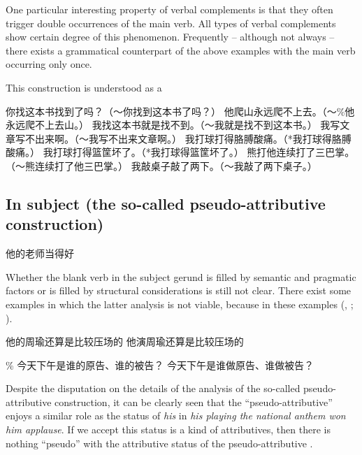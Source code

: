 \documentclass[UTF8, a4paper, oneside, scheme=plain, 12pt]{ctexrep}
\newcommand*{\citepage}[1]{p.~{#1}}
\newcommand{\form}[1]{\emph{#1}}
\begin{document}
One particular interesting property of verbal complements is 
that they often trigger double occurrences of the main verb. 
All types of verbal complements show certain degree of this phenomenon.
Frequently -- although not always -- 
there exists a grammatical counterpart of the above examples with the main verb occurring only once.

This construction is understood as a 

\begin{exe}
    \ex 你找这本书找到了吗？（～你找到这本书了吗？）
    \ex 他爬山永远爬不上去。（～\%他永远爬不上去山。）
    \ex 我找这本书就是找不到。（～我就是找不到这本书。）
    \ex 我写文章写不出来啊。（～我写不出来文章啊。）
    \ex 我打球打得胳膊酸痛。（*我打球得胳膊酸痛。）
    \ex 我打球打得篮筐坏了。（*我打球得篮筐坏了。）
    \ex 熊打他连续打了三巴掌。（～熊连续打了他三巴掌。）
    \ex 我敲桌子敲了两下。（～我敲了两下桌子。）
\end{exe}

\subsection{In subject (the so-called pseudo-attributive construction)}

\begin{exe}
    \ex 他的老师当得好
\end{exe}

Whether the blank verb in the subject gerund is filled by semantic and pragmatic factors 
or is filled by structural considerations 
is still not clear.
There exist some examples in which the latter analysis is not viable, 
because in these examples 
(,
; 
\citealt[\citepage{239}]{deng2010formal}).

\begin{exe}
    \ex\label{ex:verb-phrase.vp-argument.subject-semantic.1} 
    \begin{xlist}
        \ex 他的周瑜还算是比较压场的
        \ex 他演周瑜还算是比较压场的
    \end{xlist}
    \ex\label{ex:verb-phrase.vp-argument.subject-semantic.2} 
    \begin{xlist}
        \ex \% 今天下午是谁的原告、谁的被告？
        \ex 今天下午是谁做原告、谁做被告？
    \end{xlist}
\end{exe}

Despite the disputation on the details of the analysis 
of the so-called pseudo-attributive construction,
it can be clearly seen that 
the ``pseudo-attributive'' enjoys a similar role 
as the status of \form{his} in \form{his playing the national anthem won him applause}.
If we accept this status is a kind of attributives, 
then there is nothing ``pseudo''
with the attributive status of the pseudo-attributive
\citep[\citepage{242}]{deng2010formal}.
\end{document}
